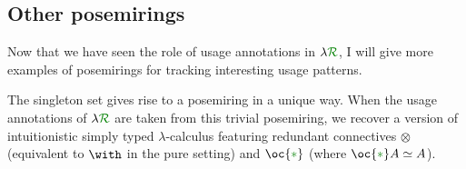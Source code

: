 \subsection{Other posemirings}\label{sec:example-posemirings}

Now that we have seen the role of usage annotations in $\name$, I will give more
examples of posemirings for tracking interesting usage patterns.

\begin{example}\label{def:trivial-posemiring}
  The singleton set gives rise to a posemiring in a unique way.
  When the usage annotations of $\name$ are taken from this trivial posemiring,
  we recover a version of intuitionistic simply typed $\lambda$-calculus
  featuring redundant connectives $\otimes$ (equivalent to $\with$ in the pure
  setting) and $\oc{\gr*}$ (where $\oc{\gr*} A \simeq A$).
\end{example}

